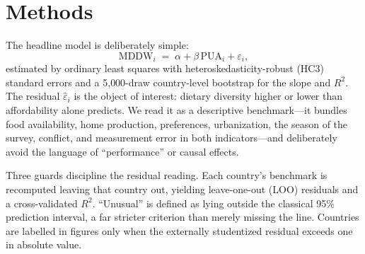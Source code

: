 \documentclass[11pt]{article}
\begin{document}
\section{Methods}\label{sec:methods}

The headline model is deliberately simple:
\begin{equation}
\mathrm{MDDW}_i \;=\; \alpha + \beta\,\mathrm{PUA}_i + \varepsilon_i,
\label{eq:main}
\end{equation}
estimated by ordinary least squares with heteroskedasticity-robust (HC3) standard errors and a 5{,}000-draw country-level bootstrap for the slope and $R^2$. The residual $\hat\varepsilon_i$ is the object of interest: dietary diversity higher or lower than affordability alone predicts. We read it as a descriptive benchmark---it bundles food availability, home production, preferences, urbanization, the season of the survey, conflict, and measurement error in both indicators---and deliberately avoid the language of ``performance'' or causal effects.

Three guards discipline the residual reading. Each country's benchmark is recomputed leaving that country out, yielding leave-one-out (LOO) residuals and a cross-validated $R^2$. ``Unusual'' is defined as lying outside the classical 95\% prediction interval, a far stricter criterion than merely missing the line. Countries are labelled in figures only when the externally studentized residual exceeds one in absolute value.
\end{document}
